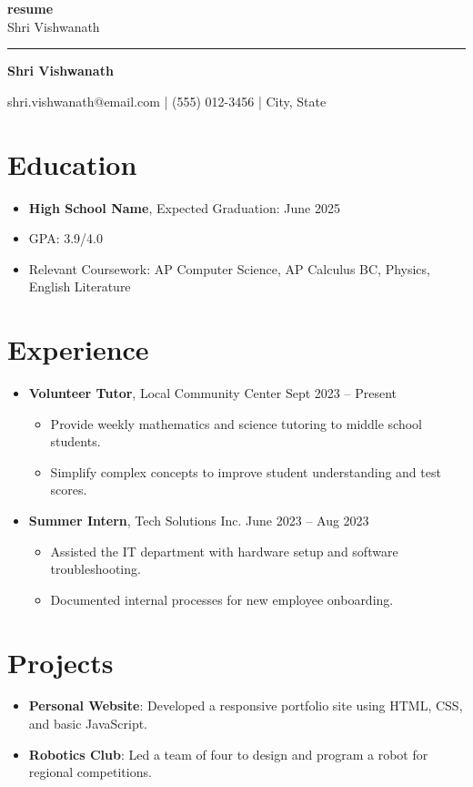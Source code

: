 \documentclass[11pt, a4paper]{article}
\begin{document}
\begin{center}
    {\LARGE \textbf{resume}}\\[0.35em]
    {\normalsize Shri Vishwanath}
\end{center}

\vspace{0.4em}
\hrule
\vspace{0.8em}

\centerline{\textbf{\Large Shri Vishwanath}}
\centerline{shri.vishwanath@email.com | (555) 012-3456 | City, State}

\section*{Education}
\begin{itemize}
    \item \textbf{High School Name}, Expected Graduation: June 2025
    \item GPA: 3.9/4.0
    \item Relevant Coursework: AP Computer Science, AP Calculus BC, Physics, English Literature
\end{itemize}

\section*{Experience}
\begin{itemize}
    \item \textbf{Volunteer Tutor}, Local Community Center \hfill Sept 2023 -- Present
    \begin{itemize}
        \item Provide weekly mathematics and science tutoring to middle school students.
        \item Simplify complex concepts to improve student understanding and test scores.
    \end{itemize}
    \item \textbf{Summer Intern}, Tech Solutions Inc. \hfill June 2023 -- Aug 2023
    \begin{itemize}
        \item Assisted the IT department with hardware setup and software troubleshooting.
        \item Documented internal processes for new employee onboarding.
    \end{itemize}
\end{itemize}

\section*{Projects}
\begin{itemize}
    \item \textbf{Personal Website}: Developed a responsive portfolio site using HTML, CSS, and basic JavaScript.
    \item \textbf{Robotics Club}: Led a team of four to design and program a robot for regional competitions.
\end{itemize}
\end{document}
